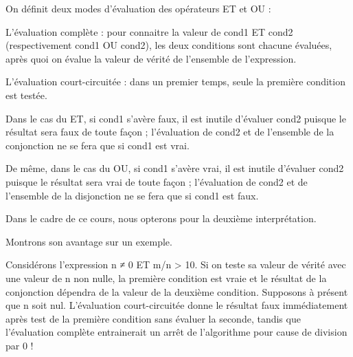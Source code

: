 \documentclass[11pt,a4paper]{article}
\begin{document}
            \par
        
            On d\'efinit deux modes d'\'evaluation des op\'erateurs ET et OU :
          
            \par
        
          L'\'evaluation compl\`ete :
          pour connaitre la valeur de cond1 ET cond2 (respectivement cond1 OU cond2), les deux
          conditions sont chacune \'evalu\'ees, apr\`es quoi on \'evalue la valeur de v\'erit\'e de l'ensemble de
          l'expression.
          
            \par
        
          L'\'evaluation court-circuit\'ee :
          dans un premier temps, seule la premi\`ere condition est test\'ee. 
          
            \par
        
          Dans le cas du ET, si cond1 s'av\`ere faux, il est inutile d'\'evaluer cond2 puisque le r\'esultat sera faux de toute fa\c con ;
          l'\'evaluation de cond2 et de l'ensemble de la conjonction ne se fera que si cond1 est vrai.
          
            \par
        
          De m\^eme, dans le cas du OU, si cond1 s'av\`ere vrai, il est inutile d'\'evaluer cond2 puisque le
          r\'esultat sera vrai de toute fa\c con ; l'\'evaluation de cond2 et de l'ensemble de la disjonction
          ne se fera que si cond1 est faux.
          
            \par
        
          Dans le cadre de ce cours, nous opterons pour la deuxi\`eme interpr\'etation. 
          
            \par
        
          Montrons son avantage sur un exemple. 
          
            \par
        
          Consid\'erons l'expression n ≠ 0 ET m/n > 10. Si on teste sa valeur
          de v\'erit\'e avec une valeur de n non nulle, la premi\`ere condition est vraie et le r\'esultat de
          la conjonction d\'ependra de la valeur de la deuxi\`eme condition. Supposons \`a pr\'esent que n
          soit nul. L'\'evaluation court-circuit\'ee donne le r\'esultat faux imm\'ediatement apr\`es test de la
          premi\`ere condition sans \'evaluer la seconde, tandis que l'\'evaluation compl\`ete entrainerait un
          arr\^et de l'algorithme pour cause de division par 0 !
          
\end{document}
